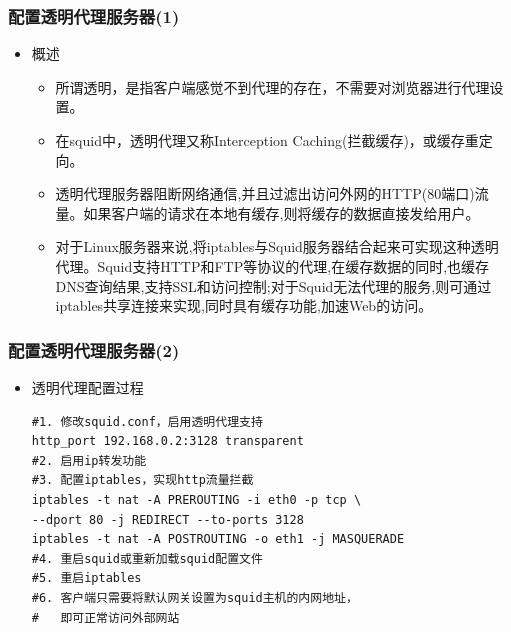 \documentclass[xcolor=svgnames,presentation]{beamer}
\begin{document}
\begin{frame}
\frametitle{配置透明代理服务器(1)}
\label{sec-4-17}
\begin{itemize}

\item 概述
\label{sec-4-17-1}%
\begin{itemize}

\item 所谓透明，是指客户端感觉不到代理的存在，不需要对浏览器进行代理设置。
\label{sec-4-17-1-1}%

\item 在squid中，透明代理又称Interception Caching(拦截缓存)，或缓存重定向。
\label{sec-4-17-1-2}%

\item 透明代理服务器阻断网络通信,并且过滤出访问外网的HTTP(80端口)流量。如果客户端的请求在本地有缓存,则将缓存的数据直接发给用户。
\label{sec-4-17-1-3}%

\item 对于Linux服务器来说,将iptables与Squid服务器结合起来可实现这种透明代理。Squid支持HTTP和FTP等协议的代理,在缓存数据的同时,也缓存DNS查询结果,支持SSL和访问控制;对于Squid无法代理的服务,则可通过iptables共享连接来实现,同时具有缓存功能,加速Web的访问。
\label{sec-4-17-1-4}%
\end{itemize} %
\end{itemize} %
\end{frame}
\begin{frame}[fragile]
\frametitle{配置透明代理服务器(2)}
\label{sec-4-18}
\begin{itemize}

\item 透明代理配置过程\\
\label{sec-4-18-1}%
\begin{verbatim}
#1. 修改squid.conf，启用透明代理支持
http_port 192.168.0.2:3128 transparent
#2. 启用ip转发功能
#3. 配置iptables，实现http流量拦截
iptables -t nat -A PREROUTING -i eth0 -p tcp \
--dport 80 -j REDIRECT --to-ports 3128
iptables -t nat -A POSTROUTING -o eth1 -j MASQUERADE
#4. 重启squid或重新加载squid配置文件
#5. 重启iptables
#6. 客户端只需要将默认网关设置为squid主机的内网地址，
#   即可正常访问外部网站
\end{verbatim}
\end{itemize} %
\end{frame}
\end{document}
